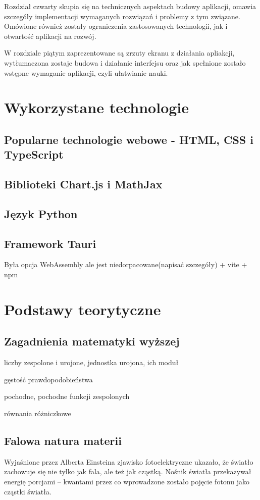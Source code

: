 \documentclass{SGGW-thesis}
\begin{document}
	Rozdział czwarty skupia się na technicznych aspektach budowy aplikacji, omawia szczegóły implementacji wymaganych rozwiązań i problemy z tym związane. Omówione również zostały ograniczenia zastosowanych technologii, jak i otwartość aplikacji na rozwój.
	
	W rozdziale piątym zaprezentowane są zrzuty ekranu z działania apliakcji, wytłumaczona zostaje budowa i działanie interfejsu oraz jak spełnione zostało wstępne wymaganie aplikacji, czyli ułatwianie nauki.
	
	
\chapter{Wykorzystane technologie}
	\section{Popularne technologie webowe - HTML, CSS i TypeScript}
	\section{Biblioteki Chart.js i MathJax}
	\section{Język Python}
	\section{Framework Tauri}
	Była opcja WebAssembly ale jest niedorpacowane(napisać szczegóły)
	+ vite + npm
	
\chapter{Podstawy teorytyczne}
	\section{Zagadnienia matematyki wyższej}
	liczby zespolone i urojone, jednostka urojona, ich moduł
	
	gęstość prawdopodobieństwa
	
	pochodne, pochodne funkcji zespolonych
	
	równania różniczkowe
	\section{Falowa natura materii}
	Wyjaśnione przez Alberta Einsteina zjawisko fotoelektryczne ukazało, że światło zachowuje się nie tylko jak fala, ale też jak cząstką. Nośnik światła przekazywał energię porcjami -- kwantami przez co wprowadzone zostało pojęcie fotonu jako cząstki światła.
	
\end{document}
